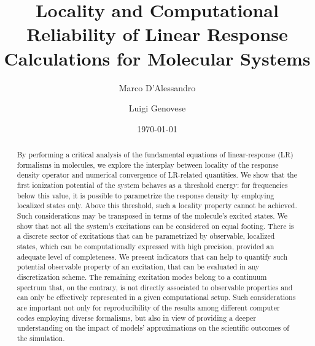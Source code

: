 \documentclass[reprint,aps,prb]{revtex4-1}
\begin{document}

\title{Locality and Computational Reliability of Linear Response Calculations for Molecular Systems}%
\author{Marco D'Alessandro}%
\author{Luigi Genovese}
\date{\today}

\begin{abstract}
By performing a critical analysis of the fundamental equations of linear-response  (LR) formalisms in molecules, 
we explore the interplay between locality of the response density operator and  numerical convergence of LR-related quantities.
We show that the first ionization potential of the system behaves as a threshold energy: for frequencies below this value, it is possible to parametrize the response density by employing localized states only. Above this threshold, such a locality property cannot be achieved. 
Such considerations may be transposed in terms of the molecule's excited states. We show that not all the system's excitations can be considered on equal footing.
There is a discrete sector of excitations that can be parametrized by observable, localized states, which can be computationally expressed with high precision, provided an adequate level of completeness. 
We present indicators that can help to quantify such potential observable property of an excitation, that can be evaluated 
in any discretization scheme.  
The remaining excitation modes belong to a continuum spectrum that, on the contrary, is not directly associated to observable properties and can only be effectively represented in a given computational setup.
Such considerations are important not only for reproducibility of the results among different computer codes 
employing diverse formalisms, but also in view of providing a deeper understanding on the impact of models' 
approximations on the scientific outcomes of the simulation.



\end{abstract}
\end{document}
